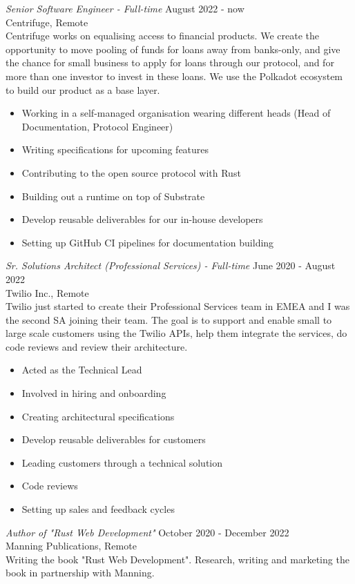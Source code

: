 \documentclass[10pt]{res} %
\begin{document}
\begin{resume}
{\sl Senior Software Engineer - Full-time} \hfill August 2022 - now \\
Centrifuge, Remote \\
Centrifuge works on equalising access to financial products. We create the opportunity to move pooling of funds for loans away from banks-only, and give the chance for small business to apply for loans through our protocol, and for more than one investor to invest in these loans. We use the Polkadot ecosystem to build our product as a base layer.
\begin{itemize} \itemsep -2pt %
\item Working in a self-managed organisation wearing different heads (Head of Documentation, Protocol Engineer)
\item Writing specifications for upcoming features
\item Contributing to the open source protocol with Rust
\item Building out a runtime on top of Substrate
\item Develop reusable deliverables for our in-house developers
\item Setting up GitHub CI pipelines for documentation building
\end{itemize}

{\sl Sr. Solutions Architect (Professional Services) - Full-time} \hfill June 2020 - August 2022 \\
Twilio Inc., Remote \\
Twilio just started to create their Professional Services team in EMEA and I was the second SA joining their team. The goal is to support and enable small to large scale customers using the Twilio APIs, help them integrate the services, do code reviews and review their architecture.
\begin{itemize} \itemsep -2pt %
\item Acted as the Technical Lead
\item Involved in hiring and onboarding
\item Creating architectural specifications
\item Develop reusable deliverables for customers
\item Leading customers through a technical solution
\item Code reviews
\item Setting up sales and feedback cycles
\end{itemize}

{\sl Author of "Rust Web Development" } \hfill October 2020 - December 2022 \\
Manning Publications, Remote\\
Writing the book "Rust Web Development". Research, writing and marketing the book in partnership with Manning. 
 

\end{resume}
\end{document}
